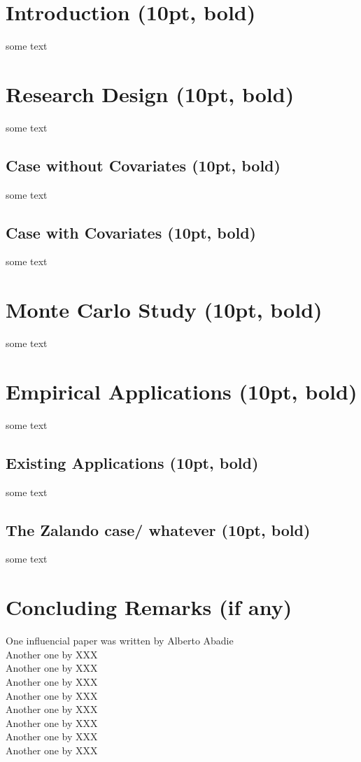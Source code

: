 \documentclass{article}
\begin{document}
	\section{Introduction (10pt, bold)}
	some text
		
	\section{Research Design (10pt, bold)}
	some text
	
	\subsection{Case without Covariates (10pt, bold)}
	some text
	
	\subsection{Case with Covariates (10pt, bold)}
	some text

	\section{Monte Carlo Study (10pt, bold)}
	some text
	
	\section{Empirical Applications (10pt, bold)}
	some text
	
	\subsection{Existing Applications (10pt, bold)}
	some text
	
	\subsection{The Zalando case/ whatever (10pt, bold)}
	some text
	
	\section{Concluding Remarks (if any)}
	One influencial paper was written by Alberto Abadie \cite{abadie:2021a} \\
Another one by XXX \cite{abadie:2007} \\
Another one by XXX \cite{abadie:2011} \\
Another one by XXX \cite{abadie:2003} \\
Another one by XXX \cite{abadie:2021b} \\
Another one by XXX \cite{amjad:2018} \\
Another one by XXX \cite{athey:2021} \\
Another one by XXX \cite{athey:2017} \\
Another one by XXX \cite{athey:2016} \\

\newpage
	
	
\end{document}
